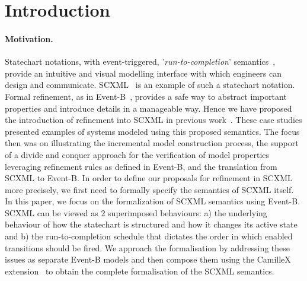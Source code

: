 \section{Introduction}
\label{sec:introduction}


\paragraph{Motivation.} Statechart notations, with event-triggered, '\emph{run-to-completion}' semantics~\cite{HAREL1987231,harel1996executable,10.1145/357474.355062}, provide an intuitive and visual modelling interface with which engineers can design and communicate.  
SCXML~\cite{scxmlwebsite} is an  example of such a statechart notation.
Formal refinement, as in  Event-B~\cite{abrial10:_model_event_b}, provides a safe way to abstract important properties and introduce details in a manageable way.
Hence we have proposed the introduction of refinement into SCXML in previous work~\cite{Morris2018,Morris2020,DBLP:journals/isse/MorrisSHHAB22}. 
These case studies presented examples of systems modeled using this proposed semantics. The focus then was on illustrating the incremental model construction process, the support of a divide and conquer approach for the verification of model properties leveraging refinement rules as defined in Event-B, and the translation from SCXML to Event-B.  
In order to define our proposals for refinement in SCXML more precisely, we first need to formally specify the  semantics of SCXML itself. 
In this paper, we focus on the formalization of SCXML semantics using Event-B. 
SCXML can be viewed as 2 superimposed behaviours:  a) the underlying behaviour of how the statechart is structured and how it changes its active state and  b) the run-to-completion schedule that dictates the order in which enabled  transitions should be fired.
We  approach the formalisation by addressing these issues as separate Event-B models and then compose them using the CamilleX extension~\cite{DBLP:conf/sefm/HoangSDFB22} to obtain the complete formalisation of the SCXML semantics.

